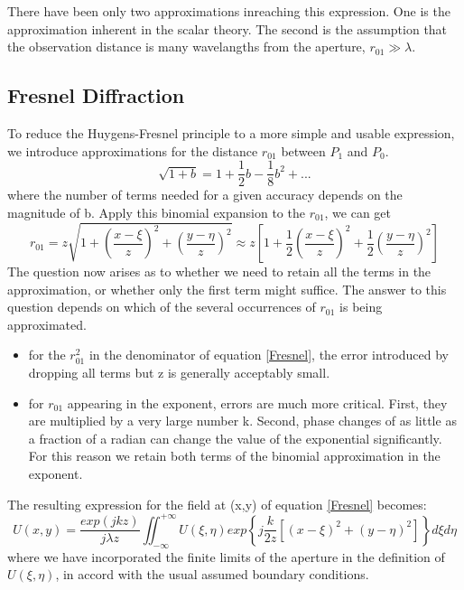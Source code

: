 \documentclass[../main.tex]{subfiles}
\begin{document}
	There have been only two approximations inreaching this expression. One is the approximation inherent in the scalar theory. The second is the assumption that the observation distance is many wavelangths from the aperture, $r_{01}\gg\lambda$.
	\subsection{Fresnel Diffraction}
	To reduce the Huygens-Fresnel principle to a more simple and usable expression, we introduce approximations for the distance $r_{01}$ between $P_1$ and $P_0$. 
	\begin{equation}
	\sqrt{1+b}=1+\frac{1}{2}b-\frac{1}{8}b^2+...
	\end{equation}
	where the number of terms needed for a given accuracy depends on the magnitude of b. Apply this binomial expansion to the $r_{01}$, we can get
	\begin{equation}
	r_{01}=z\sqrt{1+\left(\frac{x-\xi}{z}\right)^2+\left(\frac{y-\eta}{z}\right)^2}\approx z\left[1+\frac{1}{2}\left(\frac{x-\xi}{z}\right)^2+\frac{1}{2}\left(\frac{y-\eta}{z}\right)^2\right]
	\end{equation}
	The question now arises as to whether we need to retain all the terms in the approximation, or whether only the first term might suffice. The answer to this question depends on which of the several occurrences of $r_{01}$ is being approximated. 
	\begin{itemize}
	\item for the $r^2_{01}$ in the denominator of equation \ref{Fresnel}, the error introduced by dropping all terms but z is generally acceptably small.
	\item for $r_{01}$ appearing in the exponent, errors are much more critical. First, they are multiplied by a very large number k. Second, phase changes of as little as a fraction of a radian can change the value of the exponential significantly. For this reason we retain both terms of the binomial approximation in the exponent.
	\end{itemize}
	The resulting expression for the field at (x,y) of equation \ref{Fresnel} becomes:
	\begin{equation}
	U(x,y)=\frac{exp(jkz)}{j\lambda z}\iint_{-\infty}^{+\infty} U(\xi,\eta)exp\left\{j\frac{k}{2z}\left[(x-\xi)^2+(y-\eta)^2\right]\right\}d\xi d\eta\label{Fresnel2}
	\end{equation}
	where we have incorporated the finite limits of the aperture in the definition of $U(\xi,\eta)$, in accord with the usual assumed boundary conditions.
\end{document}
